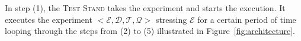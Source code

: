 In step (1), the \textsc{Test Stand} takes the experiment and starts the execution. It executes the experiment $<\mathcal{E},\mathcal{D},\mathcal{T},\mathcal{Q}>$ stressing $\mathcal{E}$ for a certain period of time looping through the steps from (2) to (5) illustrated in Figure~\ref{fig:architecture}.                                                                                                                                                                                                                                                                                                                                                                                                                                                                                                                                                                                                                                                                                                                                                                                                                                                                                                                                                                                                                                                                                                                                                                                                                                                                                                                                                                                                                                                                                                                                                                                                                                                                                                                                                                                                                                                                                                                                                                                                                                                                                                                                                                                                                                                                                                                                                                                                                                                                                                                                                                                                                                                                                                                                                                                                                                                                                                                                                                                                                                                                                                                                                         